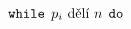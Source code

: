 \documentclass[preview]{standalone}
\begin{document}
\begin{align*}
&\hspace*{12pt}\mathtt{while} \:\: p_i \text{ dělí } n \:\: \mathtt{do}
\end{align*}
\end{document}
